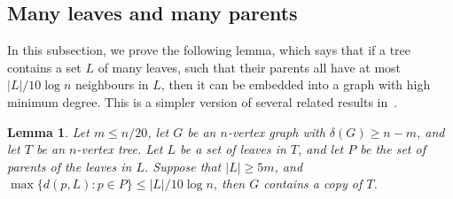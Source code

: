 \documentclass{article}
\theoremstyle{plain}
\newtheorem{lemma}[theorem]{Lemma}
\theoremstyle{definition}
\numberwithin{equation}{section}
\begin{document}
\subsection{Many leaves and many parents}\label{sec:manyleaves}
In this subsection, we prove the following lemma, which says that if a tree contains a set $L$ of many leaves, such that their parents all have at most $|L|/10\log n$ neighbours in $L$, then it can be embedded into a graph with high minimum degree. This is a simpler version of several related results in~\cite{MPY}.
\begin{lemma}\label{lemma:manyleaves}
Let $m\leq n/20$, let $G$ be an $n$-vertex graph with $\delta(G)\geq n-m$, and let $T$ be an $n$-vertex tree. Let $L$ be a set of leaves in $T$, and let $P$ be the set of parents of the leaves in $L$. Suppose that $|L|\geq 5m$, and $\max\{d(p,L):p\in P\}\leq|L|/10\log n$, then $G$ contains a copy of $T$.  
\end{lemma}
\end{document}
